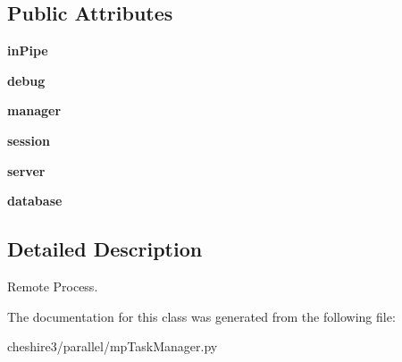 \subsection*{Public Attributes}
\begin{DoxyCompactItemize}
\item 
\hypertarget{classcheshire3_1_1parallel_1_1mp_task_manager_1_1_remote_task_af37cad40ab4a9fe431290fba3fe683df}{{\bfseries in\-Pipe}}\label{classcheshire3_1_1parallel_1_1mp_task_manager_1_1_remote_task_af37cad40ab4a9fe431290fba3fe683df}

\item 
\hypertarget{classcheshire3_1_1parallel_1_1mp_task_manager_1_1_remote_task_add1cecb332a68ffe1b27344003bfda84}{{\bfseries debug}}\label{classcheshire3_1_1parallel_1_1mp_task_manager_1_1_remote_task_add1cecb332a68ffe1b27344003bfda84}

\item 
\hypertarget{classcheshire3_1_1parallel_1_1mp_task_manager_1_1_remote_task_a30a64be00a293c83d19c1e0122f56449}{{\bfseries manager}}\label{classcheshire3_1_1parallel_1_1mp_task_manager_1_1_remote_task_a30a64be00a293c83d19c1e0122f56449}

\item 
\hypertarget{classcheshire3_1_1parallel_1_1mp_task_manager_1_1_remote_task_a864ad6833027be5d129351f418f9f8d1}{{\bfseries session}}\label{classcheshire3_1_1parallel_1_1mp_task_manager_1_1_remote_task_a864ad6833027be5d129351f418f9f8d1}

\item 
\hypertarget{classcheshire3_1_1parallel_1_1mp_task_manager_1_1_remote_task_a515380cd84b73007af8e08a637f6c4b6}{{\bfseries server}}\label{classcheshire3_1_1parallel_1_1mp_task_manager_1_1_remote_task_a515380cd84b73007af8e08a637f6c4b6}

\item 
\hypertarget{classcheshire3_1_1parallel_1_1mp_task_manager_1_1_remote_task_ab0f37e3b13076aef74d2bcef4369a911}{{\bfseries database}}\label{classcheshire3_1_1parallel_1_1mp_task_manager_1_1_remote_task_ab0f37e3b13076aef74d2bcef4369a911}

\end{DoxyCompactItemize}


\subsection{Detailed Description}
\begin{DoxyVerb}Remote Process.\end{DoxyVerb}
 

The documentation for this class was generated from the following file\-:\begin{DoxyCompactItemize}
\item 
cheshire3/parallel/mp\-Task\-Manager.\-py\end{DoxyCompactItemize}
